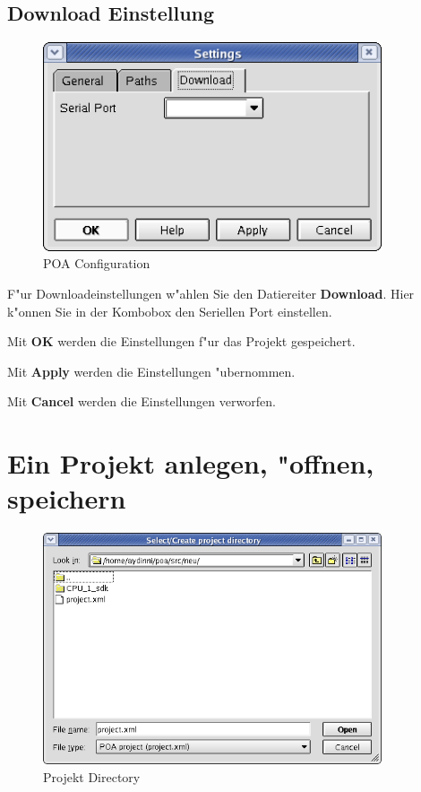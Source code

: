 \documentclass[a4paper,titlepage,12pt,ngerman]{scrbook}
\begin{document}
\subsection{Download Einstellung}
\begin{figure}[htbp]

\begin{center}

\includegraphics[width=10cm]{POAConfiguration3}

\caption{POA Configuration}\label{test}

\end{center}

\end{figure}
F"ur Downloadeinstellungen w"ahlen Sie den Datiereiter {\bf Download}. Hier k"onnen Sie in der Kombobox den Seriellen Port einstellen.\par 
Mit {\bf OK} werden die Einstellungen f"ur das Projekt gespeichert.\par
Mit {\bf Apply} werden die Einstellungen "ubernommen.\par
Mit {\bf Cancel} werden die Einstellungen verworfen.\par 


\section{Ein Projekt anlegen, "offnen, speichern}
\begin{figure}[htbp]

\begin{center}

\includegraphics[width=10cm]{Directory}

\caption{Projekt Directory}\label{test}

\end{center}

\end{figure}
\end{document}

